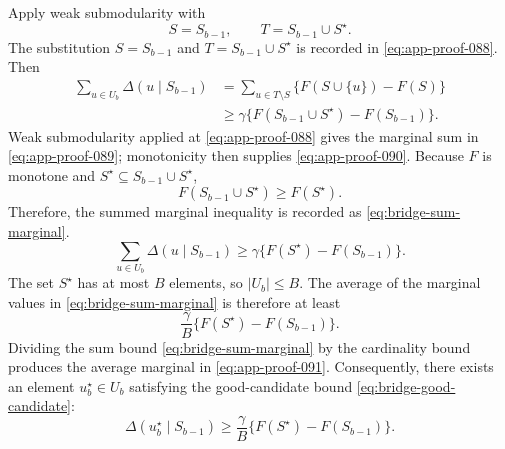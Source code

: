 \documentclass[11pt]{article}
\numberwithin{equation}{section}
\newcommand{\1}{\mathbf 1}
\newcommand{\abs}[1]{\left\lvert #1\right\rvert}
\begin{document}
Apply weak submodularity with
\begin{equation}
\label{eq:app-proof-088}
S=S_{b-1},
  \qquad
  T=S_{b-1}\cup S^\star.
\end{equation}
The substitution \(S=S_{b-1}\) and \(T=S_{b-1}\cup S^\star\) is recorded in
\eqref{eq:app-proof-088}.
Then
\begin{equation}
\label{eq:app-proof-089}
\begin{aligned}
  \sum_{u\in U_b}\Delta(u\mid S_{b-1})
  &=
  \sum_{u\in T\setminus S}
  \{F(S\cup\{u\})-F(S)\} \\
  &\ge
  \gamma\{F(S_{b-1}\cup S^\star)-F(S_{b-1})\}.
\end{aligned}
\end{equation}
Weak submodularity applied at \eqref{eq:app-proof-088} gives the marginal
sum in \eqref{eq:app-proof-089}; monotonicity then supplies
\eqref{eq:app-proof-090}.
Because \(F\) is monotone and \(S^\star\subseteq S_{b-1}\cup S^\star\),
\begin{equation}
\label{eq:app-proof-090}
F(S_{b-1}\cup S^\star)\ge F(S^\star).
\end{equation}
Therefore, the summed marginal inequality is recorded as
\eqref{eq:bridge-sum-marginal}.
\begin{equation}
  \sum_{u\in U_b}\Delta(u\mid S_{b-1})
  \ge
  \gamma\{F(S^\star)-F(S_{b-1})\}.
  \label{eq:bridge-sum-marginal}
\end{equation}
The set \(S^\star\) has at most \(B\) elements, so
\(\abs{U_b}\le B\).  The average of the marginal values in
\eqref{eq:bridge-sum-marginal} is therefore at least
\begin{equation}
\label{eq:app-proof-091}
\frac{\gamma}{B}
  \{F(S^\star)-F(S_{b-1})\}.
\end{equation}
Dividing the sum bound \eqref{eq:bridge-sum-marginal} by the cardinality
bound produces the average marginal in \eqref{eq:app-proof-091}.
Consequently, there exists an element \(u_b^\star\in U_b\) satisfying the
good-candidate bound \eqref{eq:bridge-good-candidate}:
\begin{equation}
  \Delta(u_b^\star\mid S_{b-1})
  \ge
  \frac{\gamma}{B}
  \{F(S^\star)-F(S_{b-1})\}.
  \label{eq:bridge-good-candidate}
\end{equation}
\end{document}
